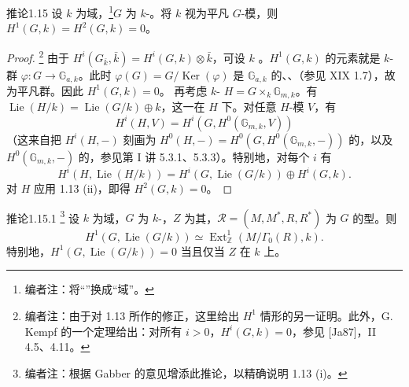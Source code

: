 \begin{SGAresult}{推论}{1.15}
设 $k$ 为域，\footnote[7]{编者注：将“”换成“域”。}$G$ 为 $k$-。将 $k$ 视为平凡 $G$-模，则 $H^1(G,k)=H^2(G,k)=0$。
\end{SGAresult}
\begin{proof}
\footnote[8]{编者注：由于对 1.13 所作的修正，这里给出 $H^1$ 情形的另一证明。此外，G. Kempf 的一个定理给出：对所有 $i>0$，$H^i(G,k)=0$，参见 [Ja87]，II 4.5、4.11。}
由于 $H^i(G_{\bar k},\bar k)=H^i(G,k)\otimes\bar k$，可设 $k$ 。$H^1(G,k)$ 的元素就是 $k$-群 $\varphi:G\to\mathbb G_{a,k}$。此时 $\varphi(G)=G/\operatorname{Ker}(\varphi)$ 是 $\mathbb G_{a,k}$ 的、、（参见 XIX 1.7），故为平凡群。因此 $H^1(G,k)=0$。
再考虑 $k$- $H=G\times_k\mathbb G_{m,k}$。有 $\operatorname{Lie}(H/k)=\operatorname{Lie}(G/k)\oplus k$，这一在 $H$ 下。对任意 $H$-模 $V$，有
\[H^i(H,V)=H^i(G,H^0(\mathbb G_{m,k},V))\]
（这来自把 $H^i(H,-)$ 刻画为 $H^0(H,-)=H^0(G,H^0(\mathbb G_{m,k},-))$ 的，以及 $H^0(\mathbb G_{m,k},-)$ 的，参见第 I 讲 5.3.1、5.3.3）。特别地，对每个 $i$ 有
\[H^i(H,\operatorname{Lie}(H/k))=H^i(G,\operatorname{Lie}(G/k))\oplus H^i(G,k).\]
对 $H$ 应用 1.13 (ii)，即得 $H^2(G,k)=0$。
\end{proof}
\begin{SGAresult}{推论}{1.15.1}
\footnote[9]{编者注：根据 Gabber 的意见增添此推论，以精确说明 1.13 (i)。}
设 $k$ 为域，$G$ 为 $k$-，$Z$ 为其，$\mathcal R=(M,M^*,R,R^*)$ 为 $G$ 的型。则
\[H^1(G,\operatorname{Lie}(G/k))\simeq\operatorname{Ext}^1_{\mathbb Z}(M/\Gamma_0(R),k).\]
特别地，$H^1(G,\operatorname{Lie}(G/k))=0$ 当且仅当 $Z$ 在 $k$ 上。
\end{SGAresult}

